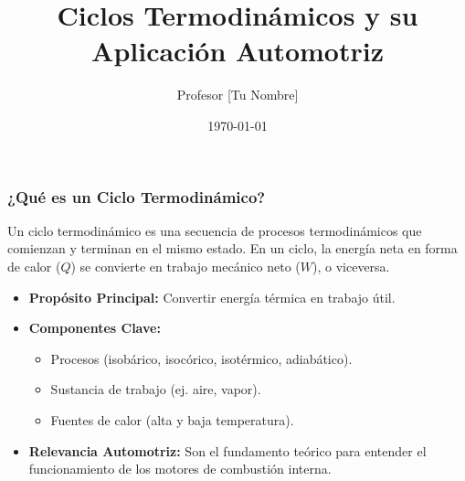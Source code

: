 \documentclass{beamer}
\title[Ciclos Termodinámicos]{Ciclos Termodinámicos y su Aplicación Automotriz}
\author{Profesor [Tu Nombre]}
\institute{Universidad Tecnológica de Puebla}
\date{\today}
\begin{document}
\begin{frame}
    \titlepage
\end{frame}

\begin{frame}
    \frametitle{¿Qué es un Ciclo Termodinámico?}
    
    Un \alert{ciclo termodinámico} es una secuencia de procesos termodinámicos que comienzan y terminan en el mismo estado. En un ciclo, la energía neta en forma de calor ($Q$) se convierte en trabajo mecánico neto ($W$), o viceversa.
    
    \begin{itemize}
        \item \textbf{Propósito Principal:} Convertir energía térmica en trabajo útil.
        \item \textbf{Componentes Clave:}
            \begin{itemize}
                \item Procesos (isobárico, isocórico, isotérmico, adiabático).
                \item Sustancia de trabajo (ej. aire, vapor).
                \item Fuentes de calor (alta y baja temperatura).
            \end{itemize}
        \item \textbf{Relevancia Automotriz:} Son el fundamento teórico para entender el funcionamiento de los motores de combustión interna.
    \end{itemize}
\end{frame}
\end{document}
